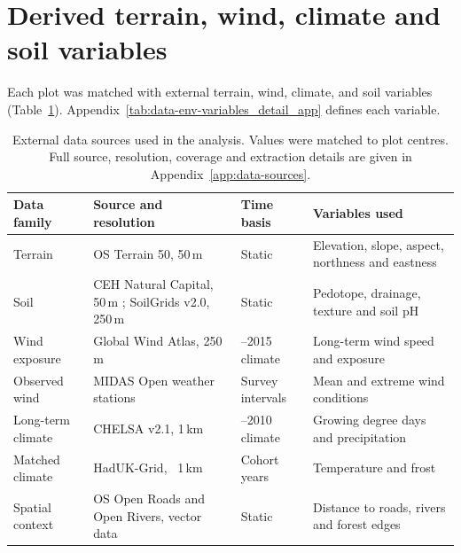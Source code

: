 \documentclass[logo,msc,ai]{infthesis}           %
\begin{document}
\section{Derived terrain, wind, climate and soil variables}
\label{sec:data-environmental}

Each plot was matched with external terrain, wind, climate, and soil variables (Table~\ref{tab:data-env-sources}). Appendix~\ref{tab:data-env-variables_detail_app} defines each variable.

\begin{table}[!htbp]
\centering
\scriptsize
\setlength{\tabcolsep}{4pt}
\renewcommand{\arraystretch}{1.05}
\begin{tabular}{ >{\raggedright\arraybackslash}p{2.0cm} >{\raggedright\arraybackslash}p{4.2cm} >{\raggedright\arraybackslash}p{2.3cm} >{\raggedright\arraybackslash}p{4.0cm}}
\hline
Data family & Source and resolution & Time basis & Variables used \\
\hline
Terrain & OS Terrain 50, 50\,m \cite{ordnancesurveyTerrain50_C3_LID} & Static & Elevation, slope, aspect, northness and eastness \\

Soil & CEH Natural Capital, 50\,m \cite{feeney2026CEHNaturalCapital_C3_LID}; SoilGrids v2.0, 250\,m \cite{poggio2021SoilGrids_C3_LID} & Static & Pedotope, drainage, texture and soil pH \\

Wind exposure & Global Wind Atlas, 250\,m \cite{davis2023GlobalWindAtlas_C3_LID} & 2006--2015 climate & Long-term wind speed and exposure \\

Observed wind & MIDAS Open weather stations \cite{metoffice2019MIDASOpen_C3_LID} & Survey intervals & Mean and extreme wind conditions \\

Long-term climate & CHELSA v2.1, 1\,km \cite{karger2017CHELSA_C3_LID} & 1981--2010 climate & Growing degree days and precipitation \\

Matched climate & HadUK-Grid, ~1\,km \cite{hollis2019HadUKGrid_C3_LID} & Cohort years & Temperature and frost \\

Spatial context & OS Open Roads and Open Rivers, vector data
\cite{ordnancesurveyOpenRoads_C3_LID,ordnancesurveyOpenRivers_C3_LID} & Static & Distance to roads, rivers and forest edges \\
\hline
\end{tabular}

\caption{\small{External data sources used in the analysis. Values were matched to plot centres. Full source, resolution, coverage and extraction details are given in Appendix~\ref{app:data-sources}.}}
\label{tab:data-env-sources}
\end{table}
\end{document}
